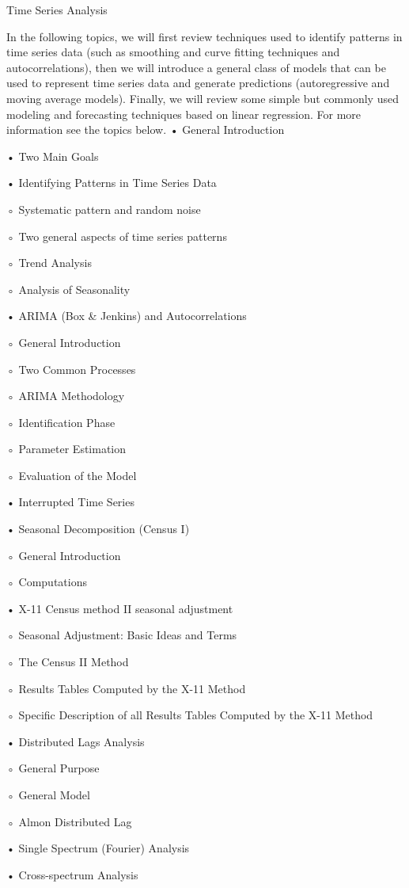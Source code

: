 
Time Series Analysis

In the following topics, we will first review techniques used to identify patterns in time series data (such as smoothing and curve fitting techniques and autocorrelations), then we will introduce a general class of models that can be used to represent time series data and generate predictions (autoregressive and moving average models). Finally, we will review some simple but commonly used modeling and forecasting techniques based on linear regression. For more information see the topics below.
•
General Introduction

•
Two Main Goals

•
Identifying Patterns in Time Series Data

◦
Systematic pattern and random noise

◦
Two general aspects of time series patterns

◦
Trend Analysis

◦
Analysis of Seasonality

•
ARIMA (Box & Jenkins) and Autocorrelations

◦
General Introduction

◦
Two Common Processes

◦
ARIMA Methodology

◦
Identification Phase

◦
Parameter Estimation

◦
Evaluation of the Model

•
Interrupted Time Series

•
Seasonal Decomposition (Census I)

◦
General Introduction

◦
Computations

•
X-11 Census method II seasonal adjustment

◦
Seasonal Adjustment: Basic Ideas and Terms

◦
The Census II Method

◦
Results Tables Computed by the X-11 Method

◦
Specific Description of all Results Tables Computed by the X-11 Method

•
Distributed Lags Analysis

◦
General Purpose

◦
General Model

◦
Almon Distributed Lag

•
Single Spectrum (Fourier) Analysis

•
Cross-spectrum Analysis

